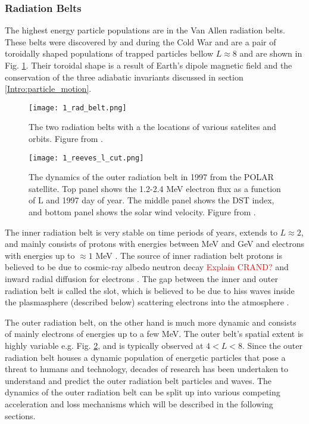 \subsubsection{Radiation Belts}\label{Intro:radiation_belt}
The highest energy particle populations are in the Van Allen radiation belts. These belts were discovered by \citet{Allen1959} and \citet{Vernov1960} during the Cold War and are a pair of toroidally shaped populations of trapped particles bellow $L \approx 8$ and are shown in Fig. \ref{Intro:rad_belts}. Their toroidal shape is a result of Earth's dipole magnetic field and the conservation of the three adiabatic invariants discussed in section \ref{Intro:particle_motion}.

\begin{figure}
\texttt{[image: 1\_rad\_belt.png]}
\caption{The two radiation belts with a the locations of various satelites and orbits. Figure from \citep{Horne2013}.}
\label{Intro:rad_belts}
\end{figure}

\begin{figure}
\texttt{[image: 1\_reeves\_l\_cut.png]}
\caption{The dynamics of the outer radiation belt in 1997 from the POLAR satellite. Top panel shows the 1.2-2.4 MeV electron flux as a function of L and 1997 day of year. The middle panel shows the DST index, and bottom panel shows the solar wind velocity. Figure from \citep{Reeves2003}.}
\label{Intro:reeves_l_cut}
\end{figure}

The inner radiation belt is very stable on time periods of years, extends to $L \approx 2$, and mainly consists of protons with energies between MeV and GeV and electrons with energies up to $\approx 1$ MeV \citep{Claudepierre2019}. The source of inner radiation belt protons is believed to be due to cosmic-ray albedo neutron decay \citep[e.g.][]{Li2017_CRAND} \textcolor{red}{Explain CRAND?} and inward radial diffusion for electrons \citep[e.g.][]{O'Brien2016_inner}. The gap between the inner and outer radiation belt is called the slot, which is believed to be due to hiss waves inside the plasmasphere (described below) scattering electrons into the atmosphere \citep[e.g.][]{Lyons1973, Breneman2015}.

The outer radiation belt, on the other hand is much more dynamic and consists of mainly electrons of energies up to a few MeV. The outer belt's spatial extent is highly variable e.g. Fig. \ref{Intro:reeves_l_cut}, and is typically observed at $4 < L < 8$. Since the outer radiation belt houses a dynamic population of energetic particles that pose a threat to humans and technology, decades of research has been undertaken to understand and predict the outer radiation belt particles and waves. The dynamics of the outer radiation belt can be split up into various competing acceleration and loss mechanisms which will be described in the following sections.

